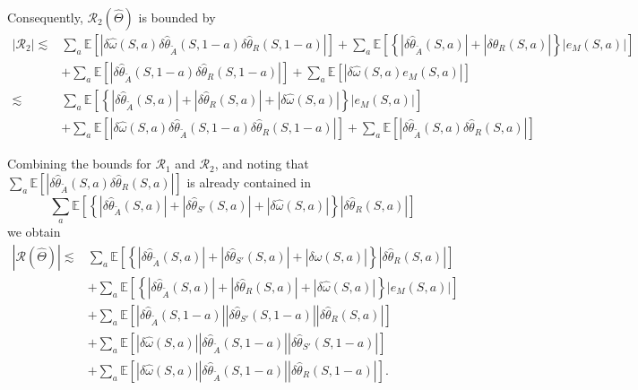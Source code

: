 \documentclass[12pt]{article}
\newcommand{\0}{\boldsymbol{0}}
\newcommand{\E}{\mathbb{E}}
\begin{document}
Consequently, \(\mathcal R_2(\widehat\Theta)\) is bounded by
\[
\begin{aligned}
|\mathcal R_2|\lesssim
&\sum_a\mathbb E\!\left[|\delta\widehat\omega(S,a) \delta\widehat\theta_{\widetilde A}(S,1-a) \delta\widehat\theta_R(S,1-a)|\right] 
+\sum_a\mathbb E\!\left[\left\{|\delta\widehat\theta_{\widetilde A}(S,a)|
+|\delta\widehat\theta_R(S,a)|\right\}|e_M(S,a)|\right] \\
&+\sum_a\mathbb E\!\left[
|\delta\widehat\theta_{\widetilde A}(S,1-a)  \delta\widehat\theta_R(S,1-a)|\right] 
+\sum_a\mathbb E\!\left[|\delta\widehat\omega(S,a) e_M(S,a)|\right] \\
\lesssim & \sum_a\mathbb E\!\left[\left\{|\delta\widehat\theta_{\widetilde A}(S,a)|
+|\delta\widehat\theta_R(S,a)| + |\delta\widehat\omega(S,a)|\right\}|e_M(S,a)|\right] \\
& + \sum_a\mathbb E\!\left[|\delta\widehat\omega(S,a) \delta\widehat\theta_{\widetilde A}(S,1-a) \delta\widehat\theta_R(S,1-a)|\right] +\sum_a\mathbb E\!\left[
|\delta\widehat\theta_{\widetilde A}(S,a)  \delta\widehat\theta_R(S,a)|\right] 
\end{aligned}
\]

Combining the bounds for $\mathcal R_1$ and $\mathcal R_2$, and noting that
\(
\sum_a \E\!\left[
|\delta\widehat\theta_{\widetilde A}(S,a)  \delta\widehat\theta_R(S,a)|\right] 
\)
is already contained in
\[
\sum_a\mathbb E\!\left[\left\{
|\delta\widehat\theta_{\widetilde A}(S,a)| +|\delta\widehat\theta_{S'}(S,a)| + |\delta\widehat\omega(S,a)|\right\} |\delta\widehat\theta_R(S,a)|
\right] 
\]
we obtain
\[
\begin{aligned}
|\mathcal R(\widehat\Theta)|
\lesssim&\sum_a\mathbb E\!\left[
\left\{|\delta\widehat\theta_{\widetilde A}(S,a)|
+|\delta\widehat\theta_{S'}(S,a)|
+|\delta\widehat\omega(S,a)|\right\}
|\delta\widehat\theta_R(S,a)|\right] \\
&+\sum_a\mathbb E\!\left[\left\{|\delta\widehat\theta_{\widetilde A}(S,a)|
+|\delta\widehat\theta_R(S,a)|
+|\delta\widehat\omega(S,a)|
\right\}|e_M(S,a)|\right] \\
&+\sum_a\mathbb E\!\left[
|\delta\widehat\theta_{\widetilde A}(S,1-a)|
|\delta\widehat\theta_{S'}(S,1-a)|
|\delta\widehat\theta_R(S,a)|
\right] \\
&+\sum_a\mathbb E\!\left[
|\delta\widehat\omega(S,a)|
|\delta\widehat\theta_{\widetilde A}(S,1-a)|
|\delta\widehat\theta_{S'}(S,1-a)|
\right] \\
&+\sum_a\mathbb E\!\left[
|\delta\widehat\omega(S,a)|
|\delta\widehat\theta_{\widetilde A}(S,1-a)|
|\delta\widehat\theta_R(S,1-a)|
\right].
\end{aligned}
\]
\end{document}

